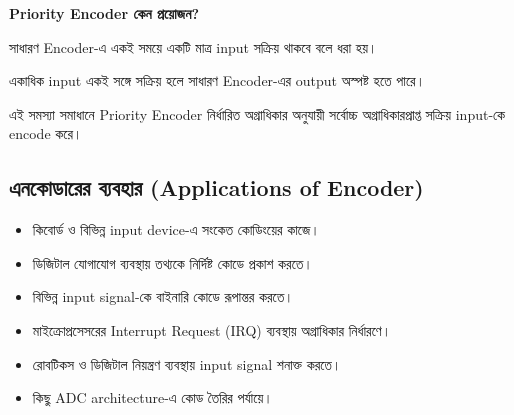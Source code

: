 \par\begingroup

\textbf{\textenglish{Priority Encoder} কেন প্রয়োজন?}

সাধারণ \textenglish{Encoder}-এ একই সময়ে
একটি মাত্র \textenglish{input} সক্রিয় থাকবে বলে ধরা হয়।

একাধিক \textenglish{input} একই সঙ্গে সক্রিয় হলে
সাধারণ \textenglish{Encoder}-এর
\textenglish{output} অস্পষ্ট হতে পারে।

এই সমস্যা সমাধানে
\textenglish{Priority Encoder} নির্ধারিত অগ্রাধিকার অনুযায়ী
সর্বোচ্চ অগ্রাধিকারপ্রাপ্ত সক্রিয়
\textenglish{input}-কে \textenglish{encode} করে।
\par\endgroup




\subsection{এনকোডারের ব্যবহার
(\textenglish{Applications of Encoder})}

\begin{itemize}[label={{\bulletfont\textbullet}}, leftmargin=*, nosep]

    \item কিবোর্ড ও বিভিন্ন
    \textenglish{input device}-এ সংকেত কোডিংয়ের কাজে।

    \item ডিজিটাল যোগাযোগ ব্যবস্থায় তথ্যকে
    নির্দিষ্ট কোডে প্রকাশ করতে।

    \item বিভিন্ন \textenglish{input signal}-কে
    বাইনারি কোডে রূপান্তর করতে।

    \item মাইক্রোপ্রসেসরের
    \textenglish{Interrupt Request (IRQ)}
    ব্যবস্থায় অগ্রাধিকার নির্ধারণে।

    \item রোবটিকস ও ডিজিটাল নিয়ন্ত্রণ ব্যবস্থায়
    \textenglish{input signal} শনাক্ত করতে।

    \item কিছু \textenglish{ADC architecture}-এ
    কোড তৈরির পর্যায়ে।

\end{itemize}



